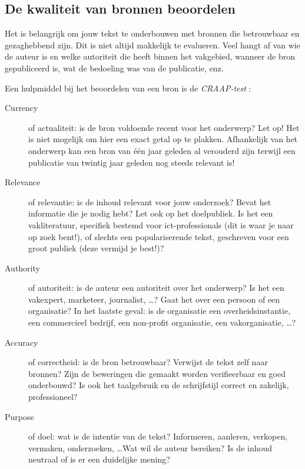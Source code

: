 \subsection{De kwaliteit van bronnen beoordelen}%
\label{sub:de-kwaliteit-van-bronnen-beoordelen}

Het is belangrijk om jouw tekst te onderbouwen met bronnen die betrouwbaar en gezaghebbend zijn. Dit is niet altijd makkelijk te evalueren. Veel hangt af van wie de auteur is en welke autoriteit die heeft binnen het vakgebied, wanneer de bron gepubliceerd is, wat de bedoeling was van de publicatie, enz.

Een hulpmiddel bij het beoordelen van een bron is de \emph{CRAAP-test} \autocite{Blakeslee2004}:

\begin{description}
  \item[Currency] of actualiteit: is de bron voldoende recent voor het onderwerp? Let op! Het is niet mogelijk om hier een exact getal op te plakken. Afhankelijk van het onderwerp kan een bron van één jaar geleden al verouderd zijn terwijl een publicatie van twintig jaar geleden nog steeds relevant is!

  \item[Relevance] of relevantie: is de inhoud relevant voor jouw onderzoek? Bevat het informatie die je nodig hebt? Let ook op het doelpubliek. Is het een vakliteratuur, specifiek bestemd voor ict-professionals (dit is waar je naar op zoek bent!), of slechts een populariserende tekst, geschreven voor een groot publiek (deze vermijd je best!)?

  \item[Authority] of autoriteit: is de auteur een autoriteit over het onderwerp? Is het een vakexpert, marketeer, journalist, \ldots? Gaat het over een persoon of een organisatie? In het laatste geval: is de organisatie een overheidsinstantie, een commercieel bedrijf, een non-profit organisatie, een vakorganisatie, \ldots?

  \item[Accuracy] of correctheid: is de bron betrouwbaar? Verwijst de tekst zelf naar bronnen? Zijn de beweringen die gemaakt worden verifieerbaar en goed onderbouwd? Is ook het taalgebruik en de schrijfstijl correct en zakelijk, professioneel?

  \item[Purpose] of doel: wat is de intentie van de tekst? Informeren, aanleren, verkopen, vermaken, onderzoeken, \ldots Wat wil de auteur bereiken? Is de inhoud neutraal of is er een duidelijke mening?
\end{description}

